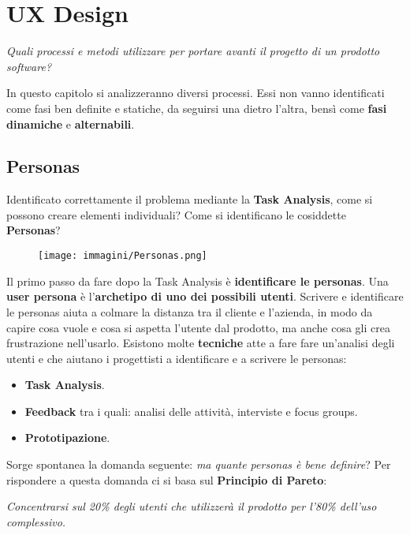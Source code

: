 \chapter{UX Design}
\begin{flushleft}
	\textit{Quali processi e metodi utilizzare per portare avanti il progetto di un prodotto software?}
\end{flushleft}

In questo capitolo si analizzeranno diversi processi.
Essi non vanno identificati come fasi ben definite e statiche, da seguirsi una dietro l'altra, bensì come \textbf{fasi} \textbf{dinamiche} e
\textbf{alternabili}.

\section{Personas}
Identificato correttamente il problema mediante la \textbf{Task Analysis}, come si  possono creare elementi individuali? Come si identificano le
cosiddette \textbf{Personas}?

\begin{figure}[!h]
	\centering
	\texttt{[image: immagini/Personas.png]}
\end{figure}

Il primo passo da fare dopo la Task Analysis è \textbf{identificare le personas}.
Una \textbf{user persona} è l'\textbf{archetipo di uno dei possibili utenti}. Scrivere e
identificare le personas aiuta a colmare la distanza tra il cliente e l'azienda, in modo da capire cosa vuole e cosa si aspetta l'utente dal prodotto,
ma anche cosa gli crea frustrazione nell'usarlo.
Esistono molte \textbf{tecniche} atte a fare fare un'analisi degli utenti e che aiutano i progettisti a identificare e a scrivere le personas:

\begin{itemize}
	\itemsep-0.3em
	\item \textbf{Task Analysis}.
	\item \textbf{Feedback} tra i quali: analisi delle attività, interviste e focus groups.
	\item \textbf{Prototipazione}.
\end{itemize}

Sorge spontanea la domanda seguente: \textit{ma quante personas è bene definire}?
Per rispondere a questa domanda ci si basa sul \textbf{Principio di Pareto}:

\textit{Concentrarsi sul 20\% degli utenti che utilizzerà il prodotto per l'80\% dell'uso complessivo.}

